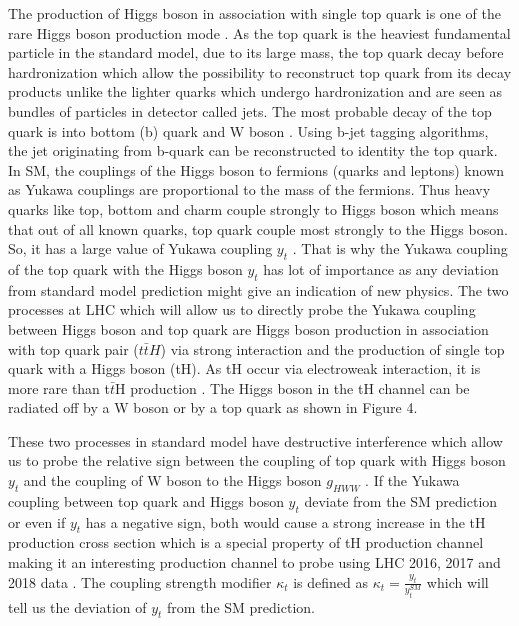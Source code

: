 \documentclass[final,3p]{CSP}
\begin{document}
The production of Higgs boson in association with single top quark is one of the rare Higgs 
boson production mode \cite{Khachatryan:2015ota}. As the top 
quark is the heaviest fundamental particle in the standard model, due to its large mass, the 
top quark decay before 
hardronization which allow the possibility to reconstruct top quark from its decay products 
unlike the lighter quarks which 
undergo hardronization and are seen as bundles of particles in detector called jets. The most 
probable decay of the top quark is 
into bottom (b) quark and W boson \cite{nishiwaki2014tth}. Using b-jet tagging algorithms, the jet originating from 
b-quark can be reconstructed to 
identity the top quark. In SM, the couplings of the Higgs boson to fermions (quarks and leptons) known as Yukawa couplings are proportional to the mass 
of the fermions. Thus heavy quarks like top, bottom and charm couple strongly to Higgs boson 
which means that out of all known 
quarks, top quark couple most strongly to the Higgs boson. So, it has a large value of Yukawa 
coupling $y_t$ \cite{Aad_2016}. That is why the 
Yukawa coupling of the top quark with the Higgs boson $y_t$ has lot of importance as any 
deviation from standard model prediction might give an indication of new physics. The two 
processes at LHC which will allow us to directly probe the Yukawa 
coupling between Higgs boson and top quark are Higgs boson production in association with top 
quark pair ($t\bar{t}H$) via 
strong interaction and the production of single top quark with a Higgs boson (tH). As tH 
occur via electroweak interaction, it 
is more rare than t$\bar{t}$H production \cite{Sirunyan:2018ygk}. The Higgs boson in the tH channel can be radiated 
off by a W boson or by a top quark as shown in Figure 4.

 These two processes in standard model have destructive interference which allow us to 
probe the relative sign between 
the coupling of top quark with Higgs boson $y_t$ and the coupling of W boson to the Higgs 
boson $g_{HWW}$ \cite{Sirunyan:2018lzm}. If the Yukawa coupling between top quark and Higgs boson $y_t$ deviate from the SM 
prediction or even if $y_t$ has a negative sign, both would cause a strong increase in the tH 
production cross section which is a special property of tH production channel making it an 
interesting production channel to probe using LHC 2016, 2017 and 2018 data \cite{farina2013lifting}. The coupling 
strength modifier $\kappa_t$ is defined as $\kappa_t = \frac{y_t}{y^{SM}_t}$ which will tell 
us the deviation of $y_t$ from the SM prediction. 
\end{document}

